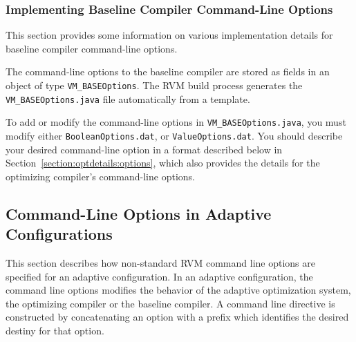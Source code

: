 \subsubsection{Implementing Baseline Compiler Command-Line Options}

This section provides some information on various
implementation details for baseline compiler command-line options.

The command-line options to the baseline compiler are
stored as fields in an object of type {\tt VM\_BASEOptions}.
The RVM build process generates the {\tt VM\_BASEOptions.java} 
file automatically from a template.  

To add or modify the command-line options in {\tt VM\_BASEOptions.java},
you must modify either {\tt BooleanOptions.dat}, or {\tt ValueOptions.dat}.
You should describe your desired command-line option in a format 
described below in Section~\ref{section:optdetails:options}, which 
also provides the details for the optimizing compiler's command-line options.

\subsection{Command-Line Options in Adaptive Configurations}
\label{subsection:adaptive:cmdline}

This section describes how non-standard RVM command line options are 
specified for an adaptive configuration.
In an adaptive configuration, the command line options modifies
the behavior of the adaptive optimization system,
the optimizing compiler or the baseline compiler.
A command line directive is constructed by concatenating an option 
with a prefix which identifies the desired destiny for that option.

